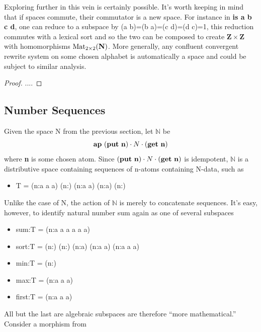 \documentclass[11pt]{article}
\begin{document}
Exploring further in this vein is certainly possible.  It's worth keeping in mind that if spaces commute, their commutator is a new space.  
For instance in {\bf is a b c d}, one can reduce to a subspace by (a b)=(b a)=(c d)=(d c)=1, this reduction commutes with a lexical sort 
and so the two can be composed to create $\mathbf Z\times\mathbf Z$ with homomorphisms ${\rm Mat}_{2\times2}(\mathbf N)$.  
More generally, any confluent convergent rewrite system on some chosen alphabet is automatically a space and could be subject to similar analysis. 

\begin{proof}
....
\end{proof}

\subsection{Number Sequences}

      Given the space N from the previous section, let {$\mathbb N$} be 
\begin{equation}
{{\bf ap}\ ({\bf put\ n})\cdot N \cdot ({\bf get\ n})}
\end{equation}
where {\bf n} is some chosen atom.  Since $({\bf put\ n})\cdot N \cdot ({\bf get\ n})$ is idempotent, ${\mathbb N}$ is a distributive space containing 
sequences of n-atoms containing N-data, such as 
\begin{itemize}
\item[] T = (n:a a a) (n:) (n:a a) (n:a) (n:)
\end{itemize} 

Unlike the case of N, the action of ${\mathbb N}$ is merely to concatenate sequences.  It's easy, however, to identify 
natural number sum again as one of several subspaces 
\begin{itemize}
\item sum:T = (n:a a a a a a)
\item sort:T = (n:) (n:) (n:a) (n:a a) (n:a a a)
\item min:T = (n:)
\item max:T = (n:a a a)
\item first:T = (n:a a a)
\end{itemize} 
All but the last are algebraic subspaces are therefore ``more mathematical.''   Consider a morphism from 
\end{document}

